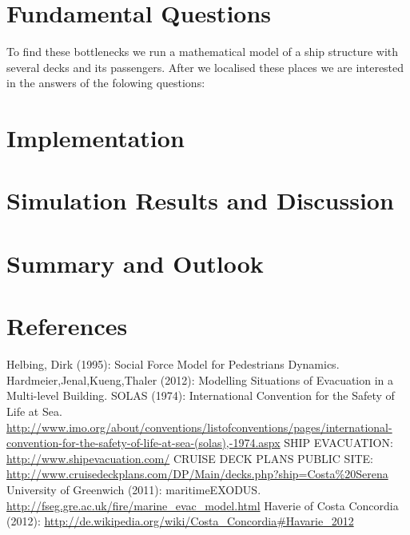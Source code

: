\documentclass[11pt]{article}
\begin{document}
\section{Fundamental Questions}
To find these bottlenecks we run a mathematical model of a ship structure \cite{shipdecks} with several decks and its passengers. After we localised these places we are interested in the answers of the folowing questions:



\section{Implementation}

\section{Simulation Results and Discussion}

\section{Summary and Outlook}

\section{References}

\begin{thebibliography}{9}
 Helbing, Dirk (1995): Social Force Model for Pedestrians Dynamics.
 Hardmeier,Jenal,Kueng,Thaler (2012): Modelling Situations of Evacuation in a Multi-level Building.
 SOLAS (1974): International Convention for the Safety of Life at Sea. \url{http://www.imo.org/about/conventions/listofconventions/pages/international-convention-for-the-safety-of-life-at-sea-(solas),-1974.aspx}
 SHIP EVACUATION: \url{http://www.shipevacuation.com/}
 CRUISE DECK PLANS PUBLIC SITE: \url{http://www.cruisedeckplans.com/DP/Main/decks.php?ship=Costa%20Serena}
 University of Greenwich (2011):  maritimeEXODUS. \url{http://fseg.gre.ac.uk/fire/marine_evac_model.html}
 Haverie of Costa Concordia (2012): \url{http://de.wikipedia.org/wiki/Costa_Concordia#Havarie_2012}
	
\end{thebibliography}
\end{document}
